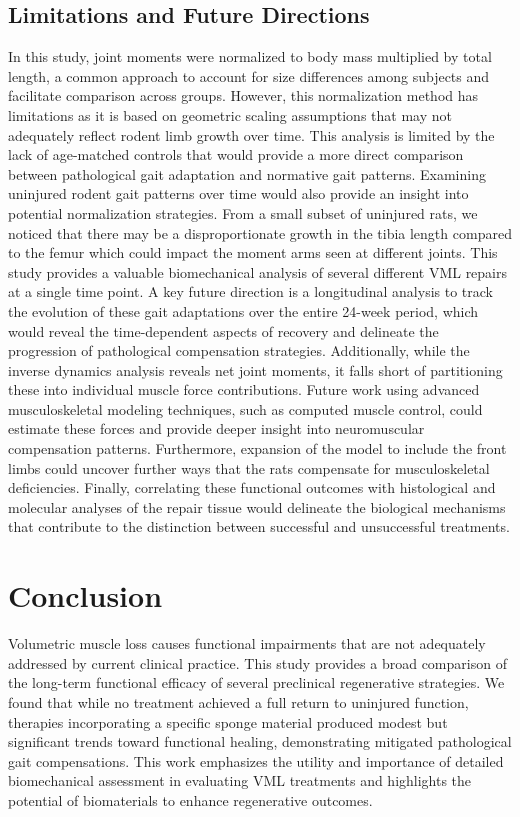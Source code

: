 \documentclass[
]{agujournal2019}
\begin{document}
\subsection{Limitations and Future
Directions}\label{limitations-and-future-directions}

In this study, joint moments were normalized to body mass multiplied by
total length, a common approach to account for size differences among
subjects and facilitate comparison across groups. However, this
normalization method has limitations as it is based on geometric scaling
assumptions that may not adequately reflect rodent limb growth over
time. This analysis is limited by the lack of age-matched controls that
would provide a more direct comparison between pathological gait
adaptation and normative gait patterns. Examining uninjured rodent gait
patterns over time would also provide an insight into potential
normalization strategies. From a small subset of uninjured rats, we
noticed that there may be a disproportionate growth in the tibia length
compared to the femur which could impact the moment arms seen at
different joints. This study provides a valuable biomechanical analysis
of several different VML repairs at a single time point. A key future
direction is a longitudinal analysis to track the evolution of these
gait adaptations over the entire 24-week period, which would reveal the
time-dependent aspects of recovery and delineate the progression of
pathological compensation strategies. Additionally, while the inverse
dynamics analysis reveals net joint moments, it falls short of
partitioning these into individual muscle force contributions. Future
work using advanced musculoskeletal modeling techniques, such as
computed muscle control, could estimate these forces and provide deeper
insight into neuromuscular compensation patterns. Furthermore, expansion
of the model to include the front limbs could uncover further ways that
the rats compensate for musculoskeletal deficiencies. Finally,
correlating these functional outcomes with histological and molecular
analyses of the repair tissue would delineate the biological mechanisms
that contribute to the distinction between successful and unsuccessful
treatments.

\section{Conclusion}\label{conclusion}

Volumetric muscle loss causes functional impairments that are not
adequately addressed by current clinical practice. This study provides a
broad comparison of the long-term functional efficacy of several
preclinical regenerative strategies. We found that while no treatment
achieved a full return to uninjured function, therapies incorporating a
specific sponge material produced modest but significant trends toward
functional healing, demonstrating mitigated pathological gait
compensations. This work emphasizes the utility and importance of
detailed biomechanical assessment in evaluating VML treatments and
highlights the potential of biomaterials to enhance regenerative
outcomes.
\end{document}
